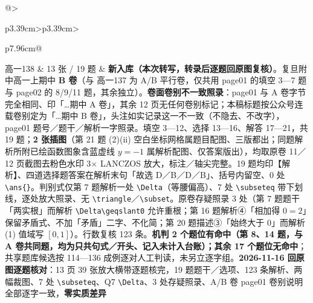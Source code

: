 \documentclass[a4paper,11pt]{article}
\begin{document}
\begin{xltabular}{\textwidth}{@{}>{\raggedright\arraybackslash}p{3.39cm}>{\centering\arraybackslash}p{3.39cm}>{\raggedright\arraybackslash}p{7.96cm}@{}}
高一138 & 13 张 / 19 题 & \textbf{新入库（本次转写，转录后逐题回原图复核）}。复旦附中高一上期中 \textbf{B 卷}（与 高一137 为 A/B 平行卷，仅共用 page01 的填空 3---7 题与 page02 的 8/9/11 题，其余独立）。\textbf{卷面卷别不一致照录}：page01 与 A 卷字节完全相同、印「\ldots 期中 A 卷」，其余 12 页无任何卷别标记；本稿标题按公众号连载卷别定为「\ldots 期中 B 卷」，头注如实记录这一不一致（不隐去、不改字），page01 题号／题干／解析一字照录。填空 3---12、选择 13---16、解答 17---21，共 19 题；\textbf{2 张插图}（第 21 题 (2)(ii) 空白坐标网格属题目配图、三版都出；同题解析所附已绘函数图象含蓝虚线 \(y=\allowbreak -1\) 属解析配图、仅答案版出），均取原卷 11／12 页截图去粉色水印 3$\times$ LANCZOS 放大，标注／轴尖完整。19 题均印【解析】、四道选择题答案在解析末句「故选 D／B／D／B」、括号内留空、0 处 \texttt{\textbackslash{}ans\{\}}。判别式仅第 7 题解析一处 \texttt{\textbackslash{}Delta}（等腰偏高）、7 处 \texttt{\textbackslash{}subseteq} 带下划线，逐处放大照录、无 \texttt{\textbackslash{}triangle}／\texttt{\textbackslash{}subset}。原卷存疑照录 3 处（第 7 题题干「两实根」而解析 \texttt{\textbackslash{}Delta\textbackslash{}geqslant0} 允许重根；第 16 题解析④「相加得 \(0=\allowbreak 2\)」保留矛盾式、不加「矛盾」二字、不化简；第 20 题描述③「始终大于 0」而解析 (1) 值域写 \([0,\allowbreak 1]\)）。行数复核 123 条。\textbf{机判 2 个题位有命中（第 8、14 题，与 A 卷共同题，均为只共句式／开头、记入未计入台账）；其余 17 个题位无命中}；共享题库候选按 114---136 成例逐对人工判读，未另立逐字组。\textbf{2026-11-16 回原图逐题核对}：13 页 39 张放大横带逐题核完，19 题题干／选项、123 条解析、两幅裁图、7 处 \texttt{\textbackslash{}subseteq}、Q7 \texttt{\textbackslash{}Delta}、3 处存疑照录、A/B 卷 page01 卷别说明全部逐字一致，\textbf{零实质差异} \\ \addlinespace[1pt]

\end{xltabular}
\end{document}
